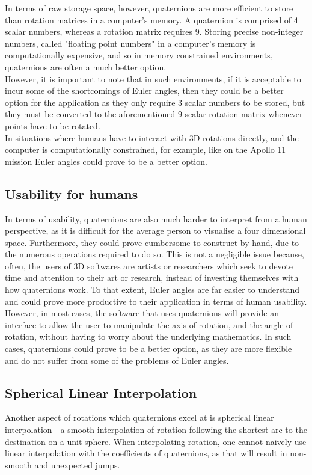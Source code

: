 \documentclass[12pt, a4paper]{article}
\begin{document}
In terms of raw storage space, however, quaternions are more efficient to store
than rotation matrices in a computer's memory. A quaternion is comprised of 4
scalar numbers, whereas a rotation matrix requires 9. Storing precise
non-integer numbers, called "floating point numbers" in a computer's memory is
computationally expensive, and so in memory constrained environments,
quaternions are often a much better option. \\

However, it is important to note that in such environments, if it is acceptable
to incur some of the shortcomings of Euler angles, then they could be a better
option for the application as they only require 3 scalar numbers to be stored,
but they must be converted to the aforementioned 9-scalar rotation matrix
whenever points have to be rotated. \\

In situations where humans have to interact with 3D rotations directly, and the
computer is computationally constrained, for example, like on the Apollo 11
mission Euler angles could prove to be a better option.

\subsection{Usability for humans}
In terms of usability, quaternions are also much harder to interpret from a
human perspective, as it is difficult for the average person to visualise a four
dimensional space. Furthermore, they could prove cumbersome to construct by
hand, due to the numerous operations required to do so. This is not a negligible
issue because, often, the users of 3D softwares are artists or researchers which
seek to devote time and attention to their art or research, instead of investing
themselves with how quaternions work. To that extent, Euler angles are far
easier to understand and could prove more productive to their application in
terms of human usability. \\

However, in most cases, the software that uses quaternions will provide an
interface to allow the user to manipulate the axis of rotation, and the angle of
rotation, without having to worry about the underlying mathematics. In such
cases, quaternions could prove to be a better option, as they are more flexible
and do not suffer from some of the problems of Euler angles. \\

\subsection{Spherical Linear Interpolation}
Another aspect of rotations which quaternions excel at is spherical linear
interpolation - a smooth interpolation of rotation following the shortest arc to
the destination on a unit sphere. When interpolating rotation, one cannot
naively use linear interpolation with the coefficients of quaternions, as that
will result in non-smooth and unexpected jumps. \\
\end{document}
